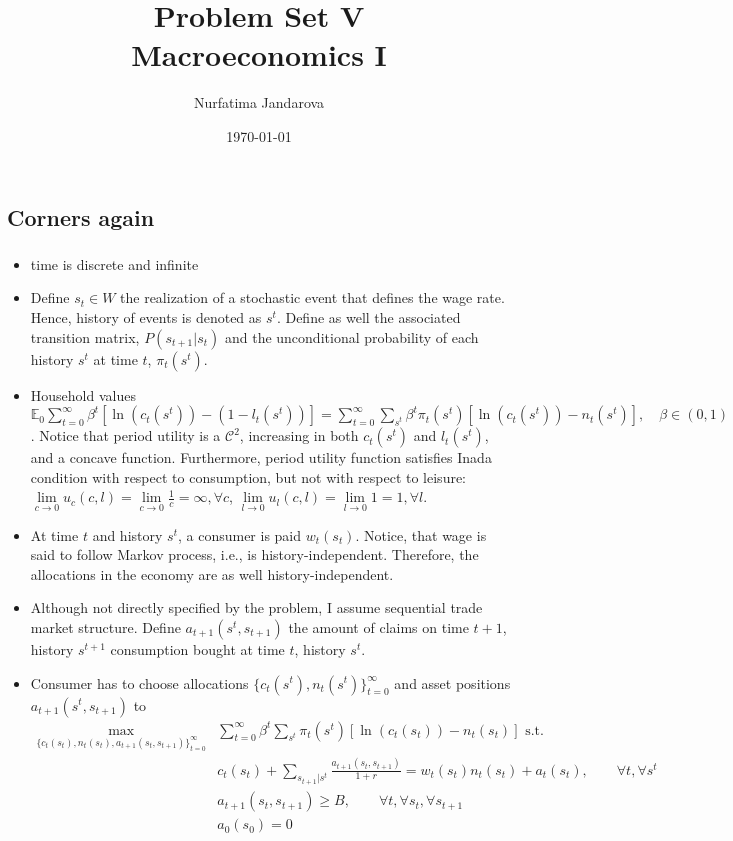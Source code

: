 \documentclass[]{article}
\title{Problem Set V \\ \large Macroeconomics I}
\author{Nurfatima Jandarova}
\date{\today}
\begin{document}
\maketitle

\subsection{Corners again}

\subsubsection{}
\begin{itemize}
	\item time is discrete and infinite
	\item Define $s_t\in W$ the realization of a stochastic event that defines the wage rate. Hence, history of events is denoted as $s^t$. Define as well the associated transition matrix, $P(s_{t+1}|s_t)$ and the unconditional probability of each history $s^t$ at time $t$, $\pi_t(s^t)$.
	\item Household values $\mathbb{E}_0\sum\limits_{t = 0}^\infty\beta^t[\ln(c_t(s^t)) - (1 - l_t(s^t))] = \sum\limits_{t = 0}^\infty\sum\limits_{s^t}\beta^t\pi_t(s^t)[\ln(c_t(s^t)) - n_t(s^t)], \quad\beta\in(0, 1)$. Notice that period utility is a  $\mathcal{C}^2$, increasing in both $c_t(s^t)$ and $l_t(s^t)$, and a concave function. Furthermore, period utility function satisfies Inada condition with respect to consumption, but not with respect to leisure: $\lim\limits_{c\to0}u_c(c, l) = \lim\limits_{c\to0}\frac{1}{c} = \infty, \forall c$, $\lim\limits_{l\to0}u_l(c, l) = \lim\limits_{l\to0}1 = 1, \forall l$.
	\item At time $t$ and history $s^t$, a consumer is paid $w_t(s_t)$. Notice, that wage is said to follow Markov process, i.e., is history-independent. Therefore, the allocations in the economy are as well history-independent.
	\item Although not directly specified by the problem, I assume sequential trade market structure. Define $a_{t+1}(s^t, s_{t+1})$ the amount of claims on time $t+1$, history $s^{t+1}$ consumption bought at time $t$, history $s^t$.
	\item Consumer has to choose allocations $\{c_t(s^t), n_t(s^t)\}_{t = 0}^\infty$ and asset positions $a_{t+1}(s^t, s_{t+1})$ to
	\begin{equation}
		\begin{split}
			\max\limits_{\{c_t(s_t), n_t(s_t), a_{t+1}(s_t, s_{t+1})\}_{t = 0}^\infty}&\sum\limits_{t = 0}^\infty\beta^t\sum\limits_{s^t}\pi_t(s^t)[\ln(c_t(s_t)) - n_t(s_t)]\text{ s.t. }\\
			&c_t(s_t) + \sum\limits_{s_{t+1}|s^t}\frac{a_{t+1}(s_t, s_{t+1})}{1+r} = w_t(s_t)n_t(s_t) + a_t(s_t), \qquad\forall t, \forall s^t\nonumber\\
			&a_{t+1}(s_t, s_{t+1}) \geq B, \qquad \forall t, \forall s_t, \forall s_{t+1}\\
			&a_0(s_0) = 0
		\end{split}
	\end{equation}
\end{itemize}
\end{document}
